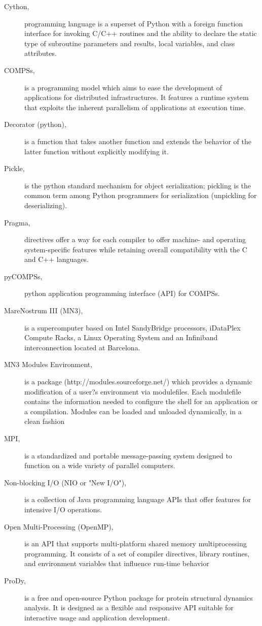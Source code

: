 \begin{description}
\item [Cython,] programming language is a superset of Python with a foreign function interface for invoking C/C++ routines and the ability to declare the static type of subroutine parameters and results, local variables, and class attributes.
\item [COMPSs,] is a programming model which aims to ease the development of applications for distributed infrastructures. It features a runtime system that exploits the inherent parallelism of applications at execution time.
\item [Decorator (python),] is a function that takes another function and extends the behavior of the latter function without explicitly modifying it.
\item [Pickle,] is the python standard mechanism for object serialization; pickling is the common term among Python programmers for serialization (unpickling for deserializing).
\item [Pragma,] directives offer a way for each compiler to offer machine- and operating system-specific features while retaining overall compatibility with the C and C++ languages.
\item[pyCOMPSs,] python application programming interface (API) for COMPSs.
\item  [MareNostrum III (MN3),]  is a supercomputer based on Intel SandyBridge processors, iDataPlex Compute Racks, a Linux Operating System and an Infiniband interconnection located at Barcelona.
\item [MN3 Modules Environment,] is a package (http://modules.sourceforge.net/) which provides a dynamic modification
of a user?s environment via modulefiles. Each modulefile contains the information needed to
configure the shell for an application or a compilation. Modules can be loaded and unloaded dynamically,
in a clean fashion
\item[MPI,] is a standardized and portable message-passing system designed to function on a wide variety of parallel computers.
\item [Non-blocking I/O (NIO or "New I/O"),] is a collection of Java programming language APIs that offer features for intensive I/O operations. 
\item [Open Multi-Processing (OpenMP),] is an API that supports multi-platform shared memory multiprocessing programming. It consists of a set of compiler directives, library routines, and environment variables that influence run-time behavior
\item [ProDy,] is a free and open-source Python package for protein structural dynamics analysis. It is designed as a flexible and responsive API suitable for interactive usage and application development.

\end{description}
